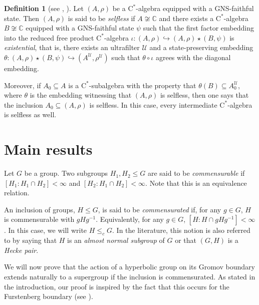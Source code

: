 \documentclass[11pt]{article}
\theoremstyle{definition}
\newtheorem{defn}[thm]{Definition}
\theoremstyle{remark}
\numberwithin{equation}{section}
\numberwithin{equation}{section}
\newcommand{\Cs}{\ensuremath{\mathrm{C}^\ast}}
\numberwithin{equation}{section}
\begin{document}
\begin{defn}[see {\cite[Definition 2.1 and Theorem 3.1]{Ro25}, \cite[Definition 2.3]{HKEPR25}}]\label{definitionsefl}
Let $(A,\rho)$ be a \Cs-algebra equipped with a GNS-faithful state. Then $(A,\rho)$ is said to be \emph{selfless}
if $A\not\cong\mathbb{C}$ and there exists a \Cs-algebra $B\not\cong\mathbb C$ equipped with a GNS-faithful state $\psi$ such that the first factor embedding into the reduced free product \Cs-algebra $\iota\colon (A,\rho) \hookrightarrow (A,\rho) \star (B,\psi)$ is \emph{existential}, that is, there exists an ultrafilter $\mathcal U$ and a state-preserving embedding $\theta\colon(A,\rho)\star(B,\psi)\hookrightarrow(A^{\mathcal U},\rho^{\mathcal U})$ such that $\theta \circ \iota$ agrees with the diagonal embedding.

Moreover, if $A_0\subseteq A$ is a \Cs-subalgebra with the property that $\theta(B)\subseteq A_0^{\mathcal U}$, where $\theta$ is the embedding witnessing that $(A,\rho)$ is selfless, then one says that the inclusion $A_0 \subseteq (A,\rho)$ is selfless. In this case, every intermediate \Cs-algebra is selfless as well.
\end{defn}

\section{Main results}\label{mainsec}





Let $G$ be a group. Two subgroups $H_1,H_2\leq G$ are said to be \emph{commensurable} if $[H_1:H_1\cap H_2]<\infty$ and $[H_2:H_1\cap H_2]<\infty$. Note that this is an equivalence relation. 

An inclusion of groups, $H\leq G$, is said to be \emph{commensurated} if, for any $g\in G$,  $ H $ is commensurable with $g H  g^{-1}$. Equivalently, for any $g\in G$, $[H:H\cap gHg^{-1}]<\infty$. In this case, we will write $H\leq_cG$. In the literature, this notion is also referred to by saying that $H$ is an \emph{almost normal subgroup} of $ G$ or that $(G,H)$ is a \emph{Hecke pair}. 

We will now prove that the action of a hyperbolic group on its Gromov boundary extends naturally to a supergroup if the inclusion is commensurated. As stated in the introduction, our proof is inspired by the fact that this occurs for the Furstenberg boundary (see \cite{BKKO17,LiSc23}).
\end{document}
